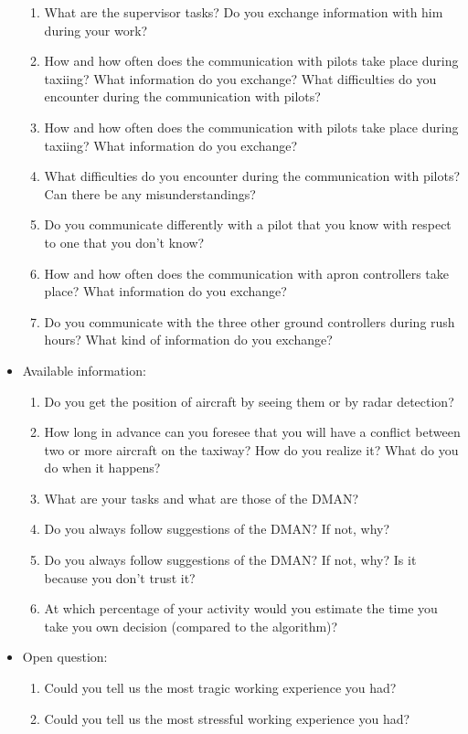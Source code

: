 \documentclass{article}
\begin{document}
\begin{itemize}
\begin{enumerate}
            \item What are the supervisor tasks? Do you exchange information with him during your work?
            \item How and how often does the communication with pilots take place during taxiing? What information do you exchange? What difficulties do you encounter during the communication with pilots? 
            \item How and how often does the communication with pilots take place during taxiing? What information do you exchange? 
            \item What difficulties do you encounter during the communication with pilots? Can there be any misunderstandings?
            \item Do you communicate differently with a pilot that you know with respect to one that you don't know?
            \item How and how often does the communication with apron controllers take place? What information do you exchange?
            \item Do you communicate with the three other ground controllers during rush hours? What kind of information do you exchange?
        \end{enumerate}
        
    \item Available information:
        \begin{enumerate}
            \item Do you get the position of aircraft by seeing them or by radar detection?
            \item How long in advance can you foresee that you will have a conflict between two or more aircraft on the taxiway? How do you realize it? What do you do when it happens?
            \item What are your tasks and what are those of the DMAN? 
            \item Do you always follow suggestions of the DMAN? If not, why?
            \item Do you always follow suggestions of the DMAN? If not, why? Is it because you don't trust it?
            \item At which percentage of your activity would you estimate the time you take you own decision (compared to the algorithm)? 
        \end{enumerate}
    \item Open question:
    \begin{enumerate}

        \item Could you tell us the most tragic working experience you had?

        \item Could you tell us the most stressful working experience you had?
    \end{enumerate}
	
	\end{itemize}
\end{document}
